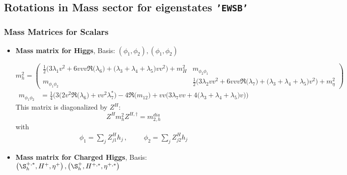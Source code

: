 \subsection{Rotations in Mass sector for eigenstates {\tt 'EWSB'} } 
\subsubsection{Mass Matrices for Scalars}
\begin{itemize} 
\item {\bf Mass matrix for Higgs}, Basis: \( \left(\phi_1, \phi_2\right), \left(\phi_1, \phi_2\right) \) 
 
\begin{equation} 
m^2_{h} = \left( 
\begin{array}{cc}
\frac{1}{2} \Big(3 \lambda_1 v^{2}  + 6 v vv {\Re\Big(\lambda_6\Big)}  + \Big(\lambda_3 + \lambda_4 + \lambda_5\Big)vv^{2} \Big) + m_H^2 &m_{\phi_2\phi_1}\\ 
m_{\phi_1\phi_2} &\frac{1}{2} \Big(3 \lambda_2 vv^{2}  + 6 v vv {\Re\Big(\lambda_7\Big)}  + \Big(\lambda_3 + \lambda_4 + \lambda_5\Big)v^{2} \Big) + m_\eta^2\end{array} 
\right) 
 \end{equation} 
\begin{align} 
m_{\phi_1\phi_2} &= \frac{1}{4} \Big(3 \Big(2 v^{2} {\Re\Big(\lambda_6\Big)}  + vv^{2} \lambda_7^* \Big) -4 {\Re\Big(m_{12}\Big)}  + vv \Big(3 \lambda_7 vv  + 4 \Big(\lambda_3 + \lambda_4 + \lambda_5\Big)v \Big)\Big)
\end{align} 
This matrix is diagonalized by \(Z^H\): 
\begin{equation} 
Z^H m^2_{h} Z^{H,\dagger} = m^{dia}_{2,h} 
\end{equation} 
with 
\begin{align} 
\phi_1 = \sum_{j}Z_{{j 1}}^{H}h_{{j}}\,, \hspace{1cm} 
\phi_2 = \sum_{j}Z_{{j 2}}^{H}h_{{j}}
\end{align} 
\item {\bf Mass matrix for Charged Higgs}, Basis: \( \left(\S_h^{+,*}, H^+, \eta^+\right), \left(\S_h^+, H^{+,*}, \eta^{+,*}\right) \) 
 

\end{itemize}
